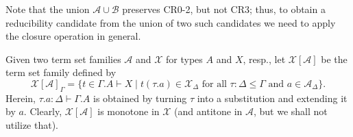 \documentclass[a4paper,USenglish,cleveref, autoref, thm-restate]{lipics-v2019}
\newcommand{\A}{\mathcal{A}}
\newcommand{\B}{\mathcal{B}}
\newcommand{\X}{\mathcal{X}}
\newcommand{\SN}{\mathsf{SN}}
\begin{document}
Note that the union $\A \cup \B$ preserves CR0-2, but not CR3; thus,
to obtain a reducibility candidate from the union of two such
candidates we need to apply the closure operation in general.

Given two term set families $\A$ and $\X$ for types $A$ and $X$,
resp., let $\X[\A]$ be the term set family defined by
\[
  \X[\A]_\Gamma =
  \{ t \in \Gamma.A \vdash X
     \mid t(\tau.a) \in \X_\Delta
     \mbox{ for all } \tau : \Delta \leq \Gamma
     \mbox{ and } a \in \A_\Delta
  \}
  .
\]
Herein, $\tau.a : \Delta \vdash \Gamma.A$ is obtained by turning
$\tau$ into a substitution and extending it by $a$.
Clearly, $\X[\A]$ is monotone in $\X$ (and antitone in $\A$, but we
shall not utilize that).
\end{document}
